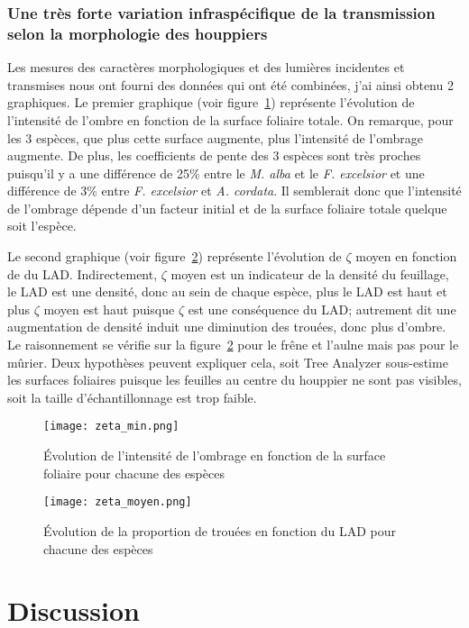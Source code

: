 \documentclass[12pt]{report}
\newcommand\indexp[1]{#1\index{#1}}
\begin{document}
\subsection{Une très forte variation infraspécifique de la transmission selon la
  morphologie des houppiers}

Les mesures des caractères morphologiques et des lumières incidentes et
transmises nous ont fourni des données qui ont été combinées, j'ai ainsi obtenu
2 graphiques. Le premier graphique (voir figure~\ref{fig:zeta_min}) représente
l'évolution de l'intensité de l'ombre en fonction de la surface foliaire totale.
On remarque, pour les 3 espèces, que plus cette surface augmente, plus
l'intensité de l'ombrage augmente. De plus, les coefficients de pente des 3
espèces sont très proches puisqu'il y a une différence de 25\% entre le
\textit{M. alba} et le \textit{F. excelsior} et une différence de 3\% entre
\textit{F. excelsior} et \textit{A. cordata}. Il semblerait donc que l'intensité
de l'ombrage dépende d'un facteur initial et de la surface foliaire totale
quelque soit l'espèce.

Le second graphique (voir figure~\ref{fig:zeta_moyen}) représente l'évolution de $\zeta$
moyen en fonction de du LAD. Indirectement, $\zeta$ moyen est un indicateur de
la densité du feuillage, le \indexp{LAD} est une densité, donc au sein de chaque espèce,
plus le LAD est haut et plus $\zeta$ moyen est haut puisque $\zeta$ est une
conséquence du LAD; autrement dit une augmentation de densité induit une
diminution des trouées, donc plus d'ombre. Le raisonnement se vérifie sur la
figure~\ref{fig:zeta_moyen} pour le frêne et l'aulne mais pas pour le mûrier. Deux
hypothèses peuvent expliquer cela, soit Tree Analyzer sous-estime les
surfaces foliaires puisque les feuilles au centre du houppier ne sont pas
visibles, soit la taille d'échantillonnage est trop faible.

\begin{figure}
  \centering
  \texttt{[image: zeta\_min.png]}
  \caption{Évolution de l'intensité de l'ombrage en fonction de la surface
    foliaire pour chacune des espèces\label{fig:zeta_min}}
\end{figure}
\begin{figure}
  \centering
  \texttt{[image: zeta\_moyen.png]}
  \caption{Évolution de la proportion de trouées en fonction du LAD pour chacune
    des espèces\label{fig:zeta_moyen}}
\end{figure}


\chapter{Discussion}
\end{document}
